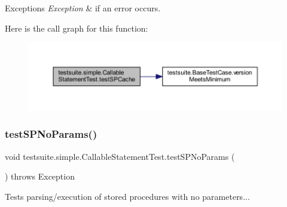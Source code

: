 \begin{DoxyExceptions}{Exceptions}
{\em Exception} & if an error occurs. \\
\hline
\end{DoxyExceptions}
Here is the call graph for this function\+:
\nopagebreak
\begin{figure}[H]
\begin{center}
\leavevmode
\includegraphics[width=350pt]{classtestsuite_1_1simple_1_1_callable_statement_test_ac41eeda6e62222c52818858c877b29f3_cgraph}
\end{center}
\end{figure}
\mbox{\label{classtestsuite_1_1simple_1_1_callable_statement_test_a5382df497dce2b6ecd935d4550a5b505}} 
\subsubsection{\texorpdfstring{test\+S\+P\+No\+Params()}{testSPNoParams()}}
{\footnotesize\ttfamily void testsuite.\+simple.\+Callable\+Statement\+Test.\+test\+S\+P\+No\+Params (\begin{DoxyParamCaption}{ }\end{DoxyParamCaption}) throws Exception}

Tests parsing/execution of stored procedures with no parameters...


